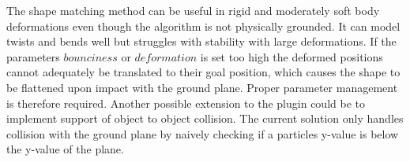 The shape matching method can be useful in rigid and moderately soft body deformations even though the algorithm is not physically grounded. 
It can model twists and bends well but struggles with stability with large deformations. 
If the parameters $bounciness$ or $deformation$ is set too high the deformed positions cannot adequately be translated to their goal position, which causes the shape to be flattened upon impact with the ground plane. Proper parameter management is therefore required. Another possible extension to the plugin could be to implement support of object to object collision. 
The current solution only handles collision with the ground plane by naively checking if a particles y-value is below the y-value of the plane.


\pagebreak




